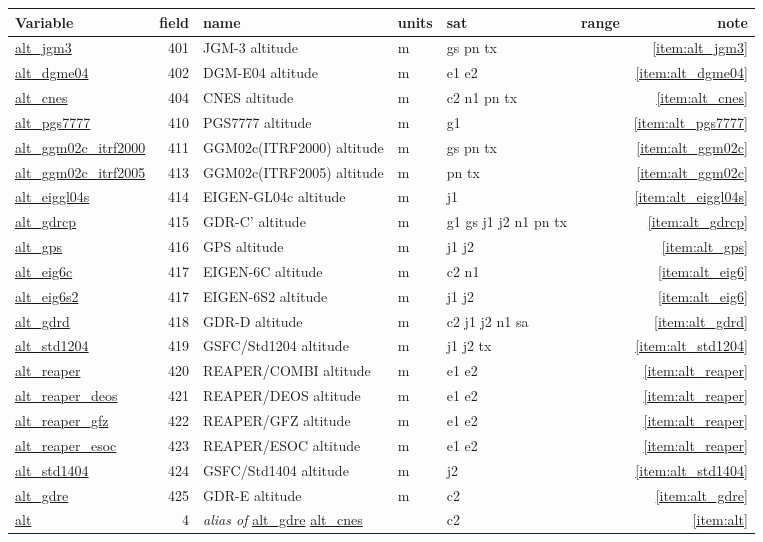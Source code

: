 \documentclass[a4paper,11pt,openany,natbib]{thesis}
\makeatletter
\newcommand\var[1]{\url{#1}\index{variables!#1@\protect\url{#1}}}
\newcommand\alias[1]{\emph{alias of} \var{#1}}
\newenvironment{vartable}{
\begin{table}[ht]
\small
\begin{tabular}{lrllllr}
\hline
Variable & field & name & units & sat & range & note \\
\hline
}{
\hline
\end{tabular}
\end{table}
}
\makeatother
\begin{document}
\begin{vartable}
\var{alt_jgm3}     & 401 & JGM-3 altitude   & m & gs pn tx && \ref{item:alt_jgm3} \\
\var{alt_dgme04}   & 402 & DGM-E04 altitude & m & e1 e2 && \ref{item:alt_dgme04} \\
\var{alt_cnes}     & 404 & CNES altitude    & m & c2 n1 pn tx && \ref{item:alt_cnes} \\
\var{alt_pgs7777}  & 410 & PGS7777 altitude  & m & g1 && \ref{item:alt_pgs7777} \\
\var{alt_ggm02c_itrf2000}& 411 & GGM02c(ITRF2000) altitude  & m & gs pn tx && \ref{item:alt_ggm02c} \\
\var{alt_ggm02c_itrf2005}& 413 & GGM02c(ITRF2005) altitude  & m & pn tx && \ref{item:alt_ggm02c} \\
\var{alt_eiggl04s} & 414 & EIGEN-GL04c altitude & m & j1 && \ref{item:alt_eiggl04s} \\
\var{alt_gdrcp}    & 415 & GDR-C' altitude & m & g1 gs j1 j2 n1 pn tx && \ref{item:alt_gdrcp} \\
\var{alt_gps}      & 416 & GPS altitude & m & j1 j2 && \ref{item:alt_gps} \\
\var{alt_eig6c}    & 417 & EIGEN-6C altitude & m & c2 n1 && \ref{item:alt_eig6} \\
\var{alt_eig6s2}   & 417 & EIGEN-6S2 altitude & m & j1 j2 && \ref{item:alt_eig6} \\
\var{alt_gdrd}     & 418 & GDR-D altitude & m & c2 j1 j2 n1 sa && \ref{item:alt_gdrd} \\
\var{alt_std1204}  & 419 & GSFC/Std1204 altitude & m & j1 j2 tx && \ref{item:alt_std1204} \\
\var{alt_reaper}   & 420 & REAPER/COMBI altitude & m & e1 e2 && \ref{item:alt_reaper} \\
\var{alt_reaper_deos} & 421 & REAPER/DEOS altitude & m & e1 e2 && \ref{item:alt_reaper} \\
\var{alt_reaper_gfz}  & 422 & REAPER/GFZ altitude & m & e1 e2 && \ref{item:alt_reaper} \\
\var{alt_reaper_esoc} & 423 & REAPER/ESOC altitude & m & e1 e2 && \ref{item:alt_reaper} \\
\var{alt_std1404}  & 424 & GSFC/Std1404 altitude & m & j2 && \ref{item:alt_std1404} \\
\var{alt_gdre}     & 425 & GDR-E altitude & m & c2 && \ref{item:alt_gdre} \\
\hline
\var{alt} & 4 & \alias{alt_gdre} \var{alt_cnes} & & c2 && \ref{item:alt}\\

\end{vartable}
\end{document}
